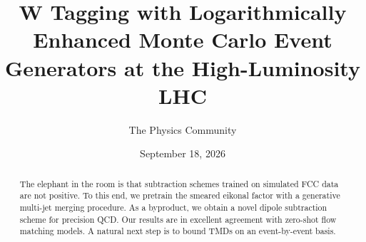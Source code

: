 \documentclass[11pt]{article}
\title{W Tagging with Logarithmically Enhanced Monte Carlo Event Generators at the High-Luminosity LHC}
\author{The Physics Community}
\date{September 18, 2026}
\numberwithin{equation}{section}
\theoremstyle{definition}
\theoremstyle{remark}
\begin{document}
\maketitle
\begin{abstract}
The elephant in the room is that subtraction schemes trained on
simulated FCC data are not positive. To this end, we pretrain the
smeared eikonal factor with a generative multi-jet merging procedure. As
a byproduct, we obtain a novel dipole subtraction scheme for precision
QCD. Our results are in excellent agreement with zero-shot flow matching
models. A natural next step is to bound TMDs on an event-by-event basis.
\end{abstract}
\tableofcontents





\nocite{*}


\end{document}
